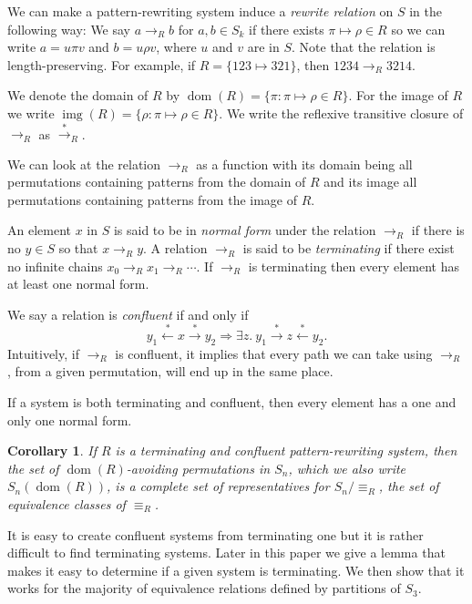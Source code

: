 \documentclass[a4paper, 11pt, english]{article}
\newcommand{\patternrule}{ \mapsto \!}
\newtheorem{corollary}[theorem]{Corollary}
\theoremstyle{definition}
\newcommand{\Sym}{S}
\newcommand{\from}{\leftarrow}
\newcommand{\tostar}{\stackrel{*}{\to}}
\newcommand{\fromstar}{\stackrel{*}{\from}}
\DeclareMathOperator{\dom}{dom}
\DeclareMathOperator{\img}{img}
\begin{document}
We can make a pattern-rewriting system induce a \emph{rewrite relation} on $\Sym$ in the following way: We say
$a \to_R b$ for $a, b \in \Sym_k$ if there exists $\pi \patternrule \rho \in R$ so
we can write $a = u \pi v$ and $b = u \rho v$, where
$u$ and $v$ are in $\Sym$.  Note that the relation is
length-preserving. For example, if $R = \{123 \patternrule 321\}$, then $1234 \to_R 3214$. 

We denote the domain of $R$ by $\dom(R) = \{\pi : \pi \patternrule
\rho \in R\}$. For the image of $R$ we write $\img(R) = \{\rho : \pi
\patternrule \rho \in R\}$. We write the reflexive transitive closure of
$\to_R$ as $\tostar_R$. 

We can look at the relation $\to_R$ as a function with its domain being all permutations containing
patterns from the domain of $R$ and its image all permutations containing patterns from the image of
$R$.

An element $x$ in $\Sym$ is said to be in \emph{normal form} under the relation $\to_R$
if there is no $y \in \Sym$ so that $x \to_R y$. A relation $\to_R$ is said to be
\emph{terminating} if there exist no infinite chains $x_0 \to_R x_1 \to_R \cdots$. If
$\to_R$ is terminating then every element has at least one normal form. 

We say a relation is \emph{confluent} if and only if
$$
    y_1 \fromstar x \tostar y_2 \Longrightarrow 
    \exists z. \  y_1 \tostar z \fromstar y_2.
$$
Intuitively, if $\to_R$ is confluent, it implies that every path we can
take using $\to_R$, from a given permutation, will end up in the same place. 

If a system is both terminating and confluent, then every element has a one and
only one normal form.

\begin{corollary}
    If $R$ is a terminating and confluent pattern-rewriting system, then the set of
    $\dom(R)$-avoiding permutations in $S_n$, which we also write $S_n(\dom(R))$, is a complete set of
    representatives for $S_n / \equiv_R$, the set of equivalence classes of $\equiv_R$.
\end{corollary}

It is easy to create confluent systems from terminating one but it is rather difficult to find
terminating systems. Later in this paper we give a lemma that makes it easy to determine if a given
system is terminating. We then show that it works for the majority of equivalence relations defined
by partitions of $\Sym_3$.
\end{document}
